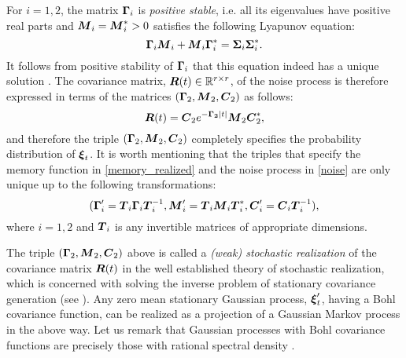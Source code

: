 For $i=1,2$, the matrix $\boldsymbol{\Gamma}_i$ is {\it positive stable}, i.e. all its eigenvalues have positive real parts and $\boldsymbol{M}_i = \boldsymbol{M}_i^* > 0$ satisfies the following Lyapunov equation:
\begin{equation} 
\boldsymbol{\Gamma}_i \boldsymbol{M}_i+\boldsymbol{M}_i \boldsymbol{\Gamma}_i^*=\boldsymbol{\Sigma}_i \boldsymbol{\Sigma}_i^*.
\end{equation}
It follows from positive stability of $\boldsymbol{\Gamma}_i$ that this equation indeed has a unique solution \cite{bellman1997introduction}. 
The covariance matrix, $\boldsymbol{R}(t) \in \mathbb{R}^{r \times r}$, of the noise process is therefore expressed in terms of  the matrices $(\boldsymbol{\Gamma}_2,\boldsymbol{M}_2,\boldsymbol{C}_2)$ as follows:
\begin{equation} \label{cov}
\boldsymbol{R}(t)=\boldsymbol{C}_2e^{-\boldsymbol{\Gamma_2}|t|}\boldsymbol{M}_2\boldsymbol{C}_2^*, 
\end{equation}
and therefore the triple $(\boldsymbol{\Gamma}_2,\boldsymbol{M}_2,\boldsymbol{C}_2)$ completely specifies the probability distribution of $\boldsymbol{\xi}_t$. It is worth mentioning  that the triples that specify the memory function in \eqref{memory_realized} and the noise process in \eqref{noise} are only unique up to the following transformations:  
\begin{equation} \label{transf_realize}
(\boldsymbol{\Gamma}'_i=\boldsymbol{T}_i \boldsymbol{\Gamma}_i \boldsymbol{T}^{-1}_i, \boldsymbol{M}_i' = \boldsymbol{T}_i \boldsymbol{M}_i \boldsymbol{T}_i^{*}, \boldsymbol{C}'_i =  \boldsymbol{C}_i \boldsymbol{T}_i^{-1}),
\end{equation}
where $i=1,2$ and $\boldsymbol{T}_i$ is any invertible matrices of appropriate dimensions. 


The triple $(\boldsymbol{\Gamma}_2,\boldsymbol{M}_2,\boldsymbol{C}_2)$ above is called a {\it (weak) stochastic realization} of the covariance matrix $\boldsymbol{R}(t)$ in the well established theory of stochastic realization, which is concerned with solving the inverse problem of stationary covariance generation (see \cite{lindquist1985realization,lindquist2015linear}).  Any zero mean stationary Gaussian process, $\boldsymbol{\xi}'_t$, having a Bohl covariance function, can be realized as a projection of a Gaussian Markov process in the above way.  Let us remark that  Gaussian processes with Bohl covariance functions are precisely those with rational spectral density \cite{willems1980stochastic}.  


